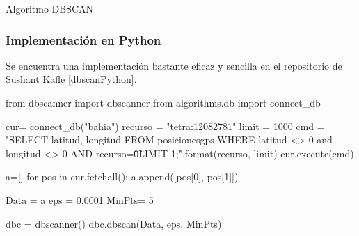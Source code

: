 \documentclass[a4paper, 12pt]{article}
\begin{document}
\begin{algorithm}[H]\label{DBSCAN}
\begin{algorithmic}[1]
		\Else
			\Else
			\EndIf
		
		\EndIf
	\EndFor
\EndFunction
\State{}
			\EndIf
		\EndIf
		\EndIf
	\EndFor
\EndFunction
\State{}
\EndFunction
\end{algorithmic}
\caption{\label{alg:DBSCAN} Algoritmo DBSCAN}
\end{algorithm}

\subsubsection{Implementaci\'on en Python}

Se encuentra una implementaci\'on bastante eficaz y sencilla en el repositorio de \href{https://github.com/SushantKafle/DBSCAN}{Sushant Kafle} \ref{dbscanPython}.\\

\begin{python}
from dbscanner import dbscanner
from algorithms.db import connect_db

cur= connect_db("bahia")
recurso = "tetra:12082781"
limit = 1000
cmd = "SELECT latitud, longitud 
	   FROM posicionesgps 
	   WHERE latitud <> 0 and longitud <> 0 
	   AND recurso=\"{0}\" 
	   LIMIT {1};".format(recurso, limit)
cur.execute(cmd)

a=[]
for pos in cur.fetchall():
    a.append([pos[0], pos[1]])

Data = a
eps = 0.0001
MinPts= 5

dbc = dbscanner()
dbc.dbscan(Data, eps, MinPts)
\end{python}
\end{document}
